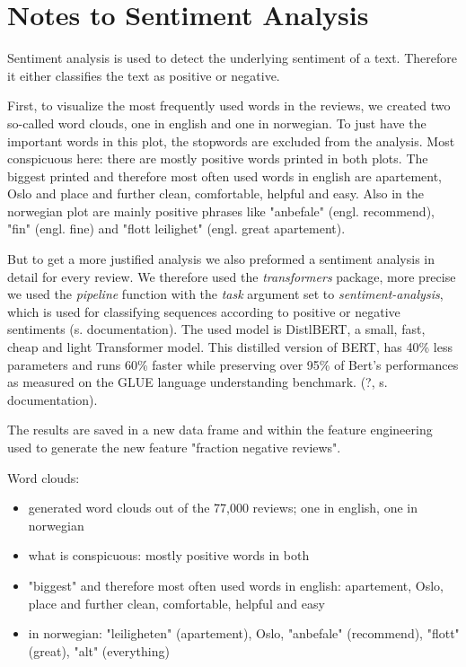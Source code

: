 \documentclass[12pt, letterpaper]{article}
\begin{document}
\section*{Notes to Sentiment Analysis}


Sentiment analysis is used to detect the underlying sentiment of a text. Therefore it either classifies
the text as positive or negative. 

First, to visualize the most frequently used words in the reviews, we created two so-called word clouds, 
one in english and one in norwegian. To just have the important words in this plot, the stopwords are
excluded from the analysis. Most conspicuous here: there are mostly positive words printed in both plots.
The biggest printed and therefore most often used words in english are apartement, Oslo and place and 
further clean, comfortable, helpful and easy. Also in the norwegian plot are mainly positive phrases like
"anbefale" (engl. recommend), "fin" (engl. fine) and "flott leilighet" (engl. great apartement).

But to get a more justified analysis we also preformed a sentiment analysis in detail for every review.
We therefore used the \textit{transformers} package, more precise we used the \textit{pipeline} function 
with the \textit{task} argument set to \textit{sentiment-analysis}, which is used for classifying sequences
according to positive or negative sentiments (s. documentation). The used model is DistlBERT, 
a small, fast, cheap and light Transformer model. This distilled version of BERT, has 40\% 
less parameters and runs 60\% faster while preserving over 95\% of Bert's performances as 
measured on the GLUE language understanding benchmark. (?, s. documentation).

The results are saved in a new data frame and within the feature engineering used to generate the
new feature "fraction negative reviews". 





\newpage
Word clouds:

\begin{itemize}
    \item generated word clouds out of the 77,000 reviews; one in english, one in norwegian
    \item what is conspicuous: mostly positive words in both
    \item "biggest" and therefore most often used words in english: apartement, Oslo, place and further clean, comfortable, 
    helpful and easy
    \item in norwegian: "leiligheten" (apartement), Oslo, "anbefale" (recommend), "flott" (great), "alt" (everything)
\end{itemize}
\end{document}
